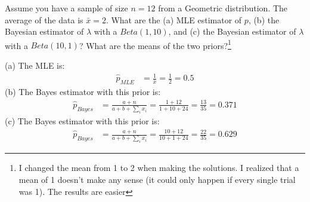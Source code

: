
Assume you have a sample of size $n = 12$ from a Geometric distribution. The 
average of the data is $\bar{x} = 2$. What are the (a) MLE estimator of $p$,
(b) the Bayesian estimator of $\lambda$ with a $Beta(1, 10)$, and (c) the
Bayesian estimator of $\lambda$ with a $Beta(10, 1)$? What are the means of
the two priors?\footnote{
  I changed the mean from 1 to 2 when making the solutions. I realized that
  a mean of 1 doesn't make any sense (it could only happen if every single
  trial was 1). The results are easier 
}


(a) The MLE is:
\begin{align*}
\hat{p}_{MLE} &= \frac{1}{\bar{x}} = \frac{1}{2} = 0.5
\end{align*}
(b) The Bayes estimator with this prior is:
\begin{align*}
\hat{p}_{Bayes} &= \frac{a + n}{a + b + \sum_i x_i} = \frac{1 + 12}{1 + 10 + 24} = \frac{13}{35} = 0.371
\end{align*}
(c) The Bayes estimator with this prior is:
\begin{align*}
\hat{p}_{Bayes} &= \frac{a + n}{a + b + \sum_i x_i} = \frac{10 + 12}{10 + 1 + 24} = \frac{22}{35} = 0.629
\end{align*}




